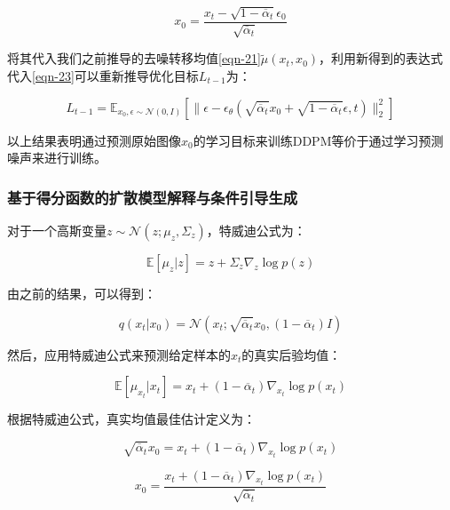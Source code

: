 \begin{equation}\label{eqn-25}
      x_0 = \frac{x_t - \sqrt{1-\overline{\alpha}_t}\epsilon_0}{\sqrt{\overline{\alpha}_t}}
\end{equation}

将其代入我们之前推导的去噪转移均值\eqref{eqn-21}$\widetilde{\mu}(x_t,x_0)$，利用新得到的表达式代入\eqref{eqn-23}可以重新推导优化目标$L_{t-1}$为：

\begin{equation}\label{eqn-26}
      L_{t-1}=\mathbb{E}_{x_0,\epsilon \sim \mathcal{N}(0,I)}[\lVert \epsilon - \epsilon_\theta (\sqrt{\overline{\alpha}_t}x_0 + \sqrt{1 - \overline{\alpha}_t}\epsilon,t)\rVert^2_2]
\end{equation}

以上结果表明通过预测原始图像$x_0$的学习目标来训练DDPM等价于通过学习预测噪声来进行训练。

\subsubsection{基于得分函数的扩散模型解释与条件引导生成}

对于一个高斯变量$z\sim \mathcal{N} ( z ; \mu_z , \Sigma_z)$，特威迪公式为：

\begin{equation}\label{eqn-27}
\mathbb{E}[\mu_z | z] = z + \Sigma_z\nabla_z\log{p(z)}
\end{equation}

由之前的结果，可以得到：

\begin{equation}\label{eqn-28}
      q(x_t|x_0) = \mathcal{N}(x_t;\sqrt{\overline{\alpha}_t}x_0,(1-\overline{\alpha}_t)I)
\end{equation}

然后，应用特威迪公式来预测给定样本的$x_t$的真实后验均值：

\begin{equation}\label{eqn-29}
  \mathbb{E}[\mu_{x_t} | x_t] = x_t + (1-\overline{\alpha}_t)\nabla_{x_t}\log{p(x_t)}
\end{equation}

根据特威迪公式，真实均值最佳估计定义为：

\begin{equation}\label{eqn-30}
  \sqrt{\overline{\alpha}_t}x_0 = x_t + (1-\overline{\alpha}_t)\nabla_{x_t}\log{p(x_t)}
\end{equation}

\begin{equation}\label{eqn-31}
  x_0 =\frac{ x_t + (1-\overline{\alpha}_t)\nabla_{x_t}\log{p(x_t)}}{\sqrt{\overline{\alpha}_t}}
\end{equation}

